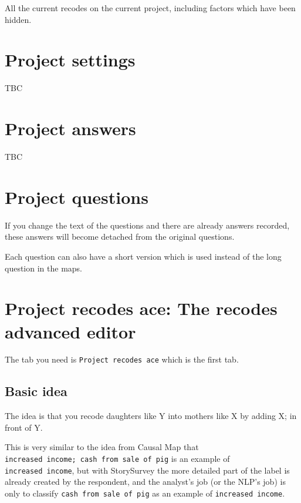 \documentclass[
]{book}
\begin{document}
All the current recodes on the current project, including factors which have been hidden.

\hypertarget{project-settings}{%
\section{Project settings}\label{project-settings}}

TBC

\hypertarget{project-answers}{%
\section{Project answers}\label{project-answers}}

TBC

\hypertarget{project-questions}{%
\section{Project questions}\label{project-questions}}

If you change the text of the questions and there are already answers recorded, these answers will become detached from the original questions.

Each question can also have a short version which is used instead of the long question in the maps.

\hypertarget{project-recodes-ace-the-recodes-advanced-editor}{%
\section{Project recodes ace: The recodes advanced editor}\label{project-recodes-ace-the-recodes-advanced-editor}}

The tab you need is \texttt{Project\ recodes\ ace} which is the first tab.

\hypertarget{basic-idea}{%
\subsection{Basic idea}\label{basic-idea}}

The idea is that you recode daughters like Y into mothers like X by adding X; in front of Y.

This is very similar to the idea from Causal Map that \texttt{increased\ income;\ cash\ from\ sale\ of\ pig} is an example of \texttt{increased\ income}, but with StorySurvey the more detailed part of the label is already created by the respondent, and the analyst's job (or the NLP's job) is only to classify \texttt{cash\ from\ sale\ of\ pig} as an example of \texttt{increased\ income}.
\end{document}
